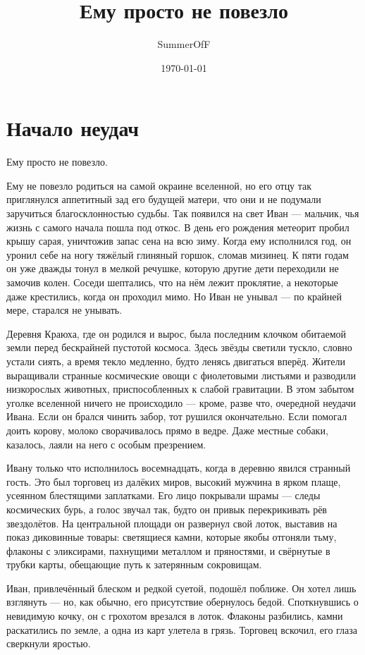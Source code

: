 \documentclass[12pt,a4paper]{book}
\title{Ему просто не повезло}
\author{SummerOfF}
\date{\today}
\begin{document}
\maketitle
\tableofcontents

\chapter{Начало неудач}

Ему просто не повезло.

Ему не повезло родиться на самой окраине вселенной, но его отцу так приглянулся аппетитный зад его будущей матери, что они и не подумали заручиться благосклонностью судьбы. Так появился на свет Иван --- мальчик, чья жизнь с самого начала пошла под откос. В день его рождения метеорит пробил крышу сарая, уничтожив запас сена на всю зиму. Когда ему исполнился год, он уронил себе на ногу тяжёлый глиняный горшок, сломав мизинец. К пяти годам он уже дважды тонул в мелкой речушке, которую другие дети переходили не замочив колен. Соседи шептались, что на нём лежит проклятие, а некоторые даже крестились, когда он проходил мимо. Но Иван не унывал --- по крайней мере, старался не унывать.

Деревня Краюха, где он родился и вырос, была последним клочком обитаемой земли перед бескрайней пустотой космоса. Здесь звёзды светили тускло, словно устали сиять, а время текло медленно, будто ленясь двигаться вперёд. Жители выращивали странные космические овощи с фиолетовыми листьями и разводили низкорослых животных, приспособленных к слабой гравитации. В этом забытом уголке вселенной ничего не происходило --- кроме, разве что, очередной неудачи Ивана. Если он брался чинить забор, тот рушился окончательно. Если помогал доить корову, молоко сворачивалось прямо в ведре. Даже местные собаки, казалось, лаяли на него с особым презрением.

Ивану только что исполнилось восемнадцать, когда в деревню явился странный гость. Это был торговец из далёких миров, высокий мужчина в ярком плаще, усеянном блестящими заплатками. Его лицо покрывали шрамы --- следы космических бурь, а голос звучал так, будто он привык перекрикивать рёв звездолётов. На центральной площади он развернул свой лоток, выставив на показ диковинные товары: светящиеся камни, которые якобы отгоняли тьму, флаконы с эликсирами, пахнущими металлом и пряностями, и свёрнутые в трубки карты, обещающие путь к затерянным сокровищам.

Иван, привлечённый блеском и редкой суетой, подошёл поближе. Он хотел лишь взглянуть --- но, как обычно, его присутствие обернулось бедой. Споткнувшись о невидимую кочку, он с грохотом врезался в лоток. Флаконы разбились, камни раскатились по земле, а одна из карт улетела в грязь. Торговец вскочил, его глаза сверкнули яростью.
\end{document}
